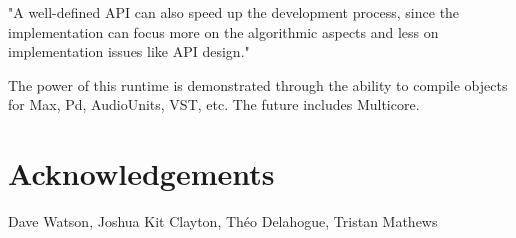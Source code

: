 \documentclass[twoside,10pt]{article}
\begin{document}
"A well-defined API can also speed up the development process, since the implementation can focus more on the algorithmic aspects and less on implementation issues like API design." \cite{Lerch:2005}

The power of this runtime is demonstrated through the ability to compile objects for Max, Pd, AudioUnits, VST, etc.  The future includes Multicore.






\section{Acknowledgements} %

Dave Watson, Joshua Kit Clayton, Théo Delahogue, Tristan Mathews




\end{document}

